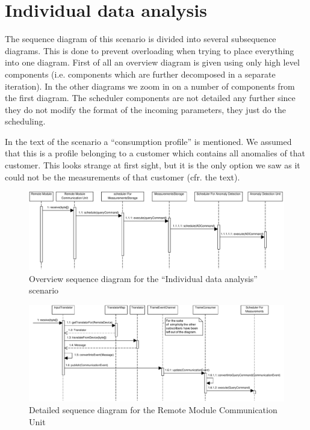\section{Individual data analysis}
\label{scenario:data-analysis}

\npar The sequence diagram of this scenario is divided into several subsequence
diagrams. This is done to prevent overloading when trying to place everything
into one diagram. First of all an overview diagram is given using only high
level components (i.e. components which are further decomposed in a separate
iteration). In the other diagrams we zoom in on a number of components from the
first diagram. The scheduler components are not detailed any further since they
do not modify the format of the incoming parameters, they just do the
scheduling.

\npar In the text of the scenario a ``consumption profile'' is mentioned. We
assumed that this is a profile belonging to a customer which contains all
anomalies of that customer. This looks strange at first sight, but it is the
only option we saw as it could not be the measurements of that customer (cfr.
the text).

\begin{figure}[H]
	\begin{centering}
		\includegraphics[width=1.2\textwidth,angle=90]{figs/scenario-5-6.pdf}
		\caption{Overview sequence diagram for the ``Individual data analysis''
		scenario}
		\label{fig:scenario-5-6}
	\end{centering}
\end{figure}

\begin{figure}[H]
	\begin{centering}
		\includegraphics[width=1.4\textwidth,angle=90]{figs/scenario-5-6a.pdf}
		\caption{Detailed sequence diagram for the Remote Module Communication Unit}
		\label{fig:scenario-5-6a}
	\end{centering}
\end{figure}

